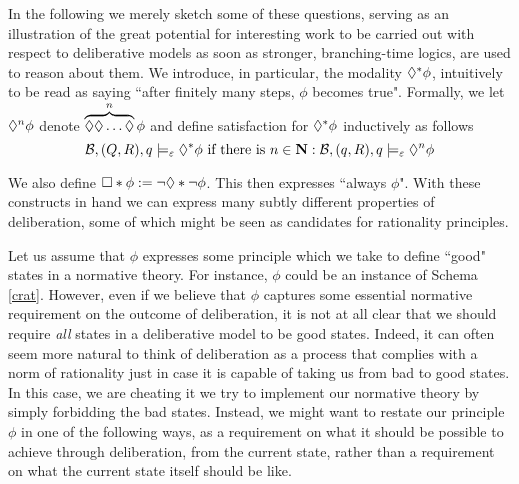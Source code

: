 \documentclass[greybox]{svmult}
\newcommand{\views}{\mathcal B}
\newcommand{\sem}{\varepsilon}
\begin{document}
In the following we merely sketch some of these questions, serving as an illustration of the great potential for interesting work to be carried out with respect to deliberative models as soon as stronger, branching-time logics, are used to reason about them. We introduce, in particular, the modality $\lozenge^* \phi$, intuitively to be read as saying ``after finitely many steps, $\phi$ becomes true". Formally, we let $\lozenge^n \phi$ denote $\overbrace{\lozenge \lozenge \ldots \lozenge}^{n} \phi$ and define satisfaction for $\lozenge^* \phi$ inductively as follows
\begin{equation}\label{sem:star}
\views,(Q,R),q \models_\sem \adia^*\phi \text{ if there is } n \in \mathbf N: \views,(q,R),q\models_\sem \adia^n \phi
\end{equation}

We also define $\square* \phi := \neg \lozenge* \neg \phi$. This then expresses ``always $\phi$". With these constructs in hand we can express many subtly different properties of deliberation, some of which might be seen as candidates for rationality principles.

Let us assume that $\phi$ expresses some principle which we take to define ``good" states in a normative theory. For instance, $\phi$ could be an instance of Schema \ref{crat}. However, even if we believe that $\phi$ captures some essential normative requirement on the outcome of deliberation, it is not at all clear that we should require \emph{all} states in a deliberative model to be good states. Indeed, it can often seem more natural to think of deliberation as a process that complies with a norm of rationality just in case it is capable of taking us from bad to good states. In this case, we are cheating it we try to implement our normative theory by simply forbidding the bad states. Instead, we might want to restate our principle $\phi$ in one of the following ways, as a requirement on what it should be possible to achieve through deliberation, from the current state, rather than a requirement on what the current state itself should be like.
\end{document}
